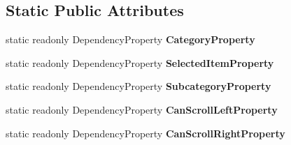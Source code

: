 \subsection*{Static Public Attributes}
\begin{DoxyCompactItemize}
\item 
static readonly Dependency\-Property {\bfseries Category\-Property}
\item 
static readonly Dependency\-Property {\bfseries Selected\-Item\-Property}
\item 
static readonly Dependency\-Property {\bfseries Subcategory\-Property}
\item 
static readonly Dependency\-Property {\bfseries Can\-Scroll\-Left\-Property}
\item 
static readonly Dependency\-Property {\bfseries Can\-Scroll\-Right\-Property}
\end{DoxyCompactItemize}
